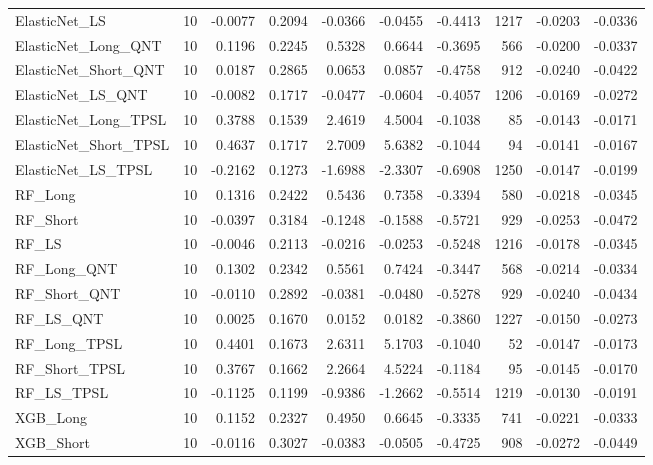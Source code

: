 \begin{tabular}{llrrrrrrrr}
\cline{1-10}
ElasticNet\_LS & 10 & -0.0077 & 0.2094 & -0.0366 & -0.0455 & -0.4413 & 1217 & -0.0203 & -0.0336 \\
\cline{1-10}
ElasticNet\_Long\_QNT & 10 & 0.1196 & 0.2245 & 0.5328 & 0.6644 & -0.3695 & 566 & -0.0200 & -0.0337 \\
\cline{1-10}
ElasticNet\_Short\_QNT & 10 & 0.0187 & 0.2865 & 0.0653 & 0.0857 & -0.4758 & 912 & -0.0240 & -0.0422 \\
\cline{1-10}
ElasticNet\_LS\_QNT & 10 & -0.0082 & 0.1717 & -0.0477 & -0.0604 & -0.4057 & 1206 & -0.0169 & -0.0272 \\
\cline{1-10}
ElasticNet\_Long\_TPSL & 10 & 0.3788 & 0.1539 & 2.4619 & 4.5004 & -0.1038 & 85 & -0.0143 & -0.0171 \\
\cline{1-10}
ElasticNet\_Short\_TPSL & 10 & 0.4637 & 0.1717 & 2.7009 & 5.6382 & -0.1044 & 94 & -0.0141 & -0.0167 \\
\cline{1-10}
ElasticNet\_LS\_TPSL & 10 & -0.2162 & 0.1273 & -1.6988 & -2.3307 & -0.6908 & 1250 & -0.0147 & -0.0199 \\
\cline{1-10}
RF\_Long & 10 & 0.1316 & 0.2422 & 0.5436 & 0.7358 & -0.3394 & 580 & -0.0218 & -0.0345 \\
\cline{1-10}
RF\_Short & 10 & -0.0397 & 0.3184 & -0.1248 & -0.1588 & -0.5721 & 929 & -0.0253 & -0.0472 \\
\cline{1-10}
RF\_LS & 10 & -0.0046 & 0.2113 & -0.0216 & -0.0253 & -0.5248 & 1216 & -0.0178 & -0.0345 \\
\cline{1-10}
RF\_Long\_QNT & 10 & 0.1302 & 0.2342 & 0.5561 & 0.7424 & -0.3447 & 568 & -0.0214 & -0.0334 \\
\cline{1-10}
RF\_Short\_QNT & 10 & -0.0110 & 0.2892 & -0.0381 & -0.0480 & -0.5278 & 929 & -0.0240 & -0.0434 \\
\cline{1-10}
RF\_LS\_QNT & 10 & 0.0025 & 0.1670 & 0.0152 & 0.0182 & -0.3860 & 1227 & -0.0150 & -0.0273 \\
\cline{1-10}
RF\_Long\_TPSL & 10 & 0.4401 & 0.1673 & 2.6311 & 5.1703 & -0.1040 & 52 & -0.0147 & -0.0173 \\
\cline{1-10}
RF\_Short\_TPSL & 10 & 0.3767 & 0.1662 & 2.2664 & 4.5224 & -0.1184 & 95 & -0.0145 & -0.0170 \\
\cline{1-10}
RF\_LS\_TPSL & 10 & -0.1125 & 0.1199 & -0.9386 & -1.2662 & -0.5514 & 1219 & -0.0130 & -0.0191 \\
\cline{1-10}
XGB\_Long & 10 & 0.1152 & 0.2327 & 0.4950 & 0.6645 & -0.3335 & 741 & -0.0221 & -0.0333 \\
\cline{1-10}
XGB\_Short & 10 & -0.0116 & 0.3027 & -0.0383 & -0.0505 & -0.4725 & 908 & -0.0272 & -0.0449 \\

\end{tabular}
